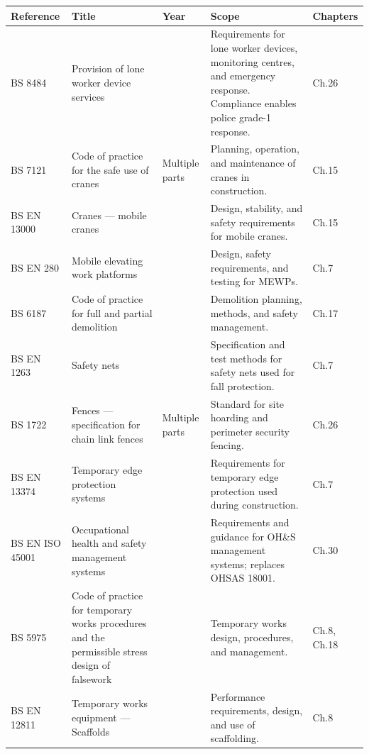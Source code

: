 \begin{table}[H]
\centering
\small
\begin{tabularx}{\textwidth}{>{\raggedright\arraybackslash}p{2.5cm}>{\raggedright\arraybackslash}p{4.0cm}>{\centering\arraybackslash}p{0.9cm}>{\raggedright\arraybackslash}p{3.0cm}>{\raggedright\arraybackslash}X}
\toprule
\textbf{Reference} & \textbf{Title} & \textbf{Year} & \textbf{Scope} & \textbf{Chapters} \\
\midrule
BS 8484 & Provision of lone worker device services & 2022 & Requirements for lone worker devices, monitoring centres, and emergency response. Compliance enables police grade-1 response. & Ch.26 \\
\midrule
BS 7121 & Code of practice for the safe use of cranes & Multiple parts & Planning, operation, and maintenance of cranes in construction. & Ch.15 \\
\midrule
BS EN 13000 & Cranes --- mobile cranes & 2010 & Design, stability, and safety requirements for mobile cranes. & Ch.15 \\
\midrule
BS EN 280 & Mobile elevating work platforms & 2022 & Design, safety requirements, and testing for MEWPs. & Ch.7 \\
\midrule
BS 6187 & Code of practice for full and partial demolition & 2011 & Demolition planning, methods, and safety management. & Ch.17 \\
\midrule
BS EN 1263 & Safety nets & 2014 & Specification and test methods for safety nets used for fall protection. & Ch.7 \\
\midrule
BS 1722 & Fences --- specification for chain link fences & Multiple parts & Standard for site hoarding and perimeter security fencing. & Ch.26 \\
\midrule
BS EN 13374 & Temporary edge protection systems & 2013 & Requirements for temporary edge protection used during construction. & Ch.7 \\
\midrule
BS EN ISO 45001 & Occupational health and safety management systems & 2018 & Requirements and guidance for OH\&S management systems; replaces OHSAS 18001. & Ch.30 \\
\midrule
BS 5975 & Code of practice for temporary works procedures and the permissible stress design of falsework & 2019 & Temporary works design, procedures, and management. & Ch.8, Ch.18 \\
\midrule
BS EN 12811 & Temporary works equipment --- Scaffolds & 2003 & Performance requirements, design, and use of scaffolding. & Ch.8 \\
\midrule

\end{tabularx}
\end{table}
